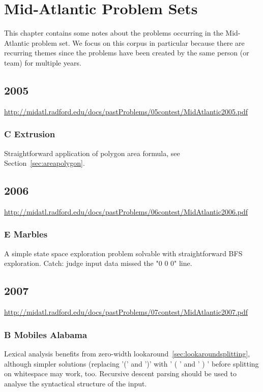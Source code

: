 \chapter{Mid-Atlantic Problem Sets}

This chapter contains some notes about the problems occurring in the Mid-Atlantic
problem set.  We focus on this corpus in particular because there are recurring
themes since the problems have been created by the same person (or team) for
multiple years.

\section{2005}

\href{(Problem PDF 2005)}{http://midatl.radford.edu/docs/pastProblems/05contest/MidAtlantic2005.pdf}

\subsection{C Extrusion}
\label{sec:2005-c-extrusion}

Straightforward application of polygon area formula, see Section~\ref{sec:areapolygon}.

\section{2006}
\href{(Problem PDF 2006)}{http://midatl.radford.edu/docs/pastProblems/06contest/MidAtlantic2006.pdf}

\subsection{E Marbles}
\label{sec:2006-e-marbles}
A simple state space exploration problem solvable with straightforward BFS exploration.
Catch: judge input data missed the "0 0 0" line.

\section{2007}
\href{(Problem PDF 2007)}{http://midatl.radford.edu/docs/pastProblems/07contest/MidAtlantic2007.pdf}

\subsection{B Mobiles Alabama}
\label{sec:2007-b-mobile}

Lexical analysis benefits from zero-width lookaround~\ref{sec:lookaroundsplitting}, although
simpler solutions (replacing '(' and ')' with ' ( ' and ' ) ' before splitting on whitespace
may work, too.
Recursive descent parsing should be used to analyse the syntactical structure of the input.

